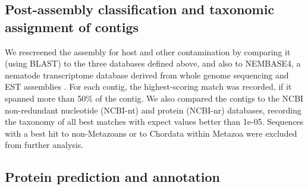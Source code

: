 \documentclass[10pt]{bmc_article}
\newenvironment{bmcformat}{\begin{raggedright}\baselineskip20pt\sloppy\setboolean{publ}{false}}{\end{raggedright}\baselineskip20pt\sloppy}
\begin{document}
\begin{bmcformat}
\subsection*{Post-assembly classification and taxonomic assignment of
  contigs}

We rescreened the assembly for host and other contamination by
comparing it (using BLAST) to the three databases defined above, and
also to NEMBASE4, a nematode transcriptome database derived from whole
genome sequencing and EST assemblies
\cite{parkinson_nembase:resource_2004, pmid21550347}. For each contig,
the highest-scoring match was recorded, if it spanned more than 50\%
of the contig. We also compared the contigs to the NCBI non-redundant
nucleotide (NCBI-nt) and protein (NCBI-nr) databases, recording the
taxonomy of all best matches with expect values better than
1e-05. Sequences with a best hit to non-Metazoans or to Chordata
within Metazoa were excluded from further analysis.


\subsection*{Protein prediction and annotation}


\end{bmcformat}
\end{document}
